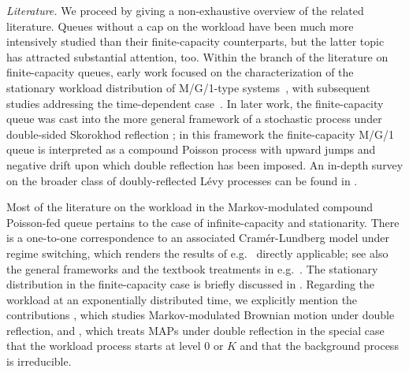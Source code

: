 \documentclass[reqno,12pt]{amsart}
\begin{document}
\medskip

{\it Literature.} We proceed by giving a non-exhaustive overview of the related literature. 
Queues without a cap on the workload have been much more intensively studied than their finite-capacity counterparts, but the latter topic has attracted substantial attention, too. Within the branch of the literature on finite-capacity queues, early work focused on the characterization of the stationary workload distribution of M/G/1-type systems~\cite{JWC,TAK}, with subsequent studies addressing the time-dependent case~\cite{R1,R2}.  In later work, the finite-capacity queue was cast into the more general framework of a stochastic process under double-sided Skorokhod reflection \cite{AND,HOU,KRU}; in this framework the finite-capacity M/G/1 queue is interpreted as a compound Poisson process with upward jumps and negative drift upon which double reflection has been imposed. An in-depth survey on the broader class of doubly-reflected L\'evy processes can be found in \cite{AAGP}. 

Most of the literature on the workload in the Markov-modulated compound Poisson-fed queue pertains to the case of infinite-capacity and stationarity. There is a one-to-one correspondence to an associated Cram\'er-Lundberg model under regime switching, which renders the results of e.g.\ \cite{IV,DM,MKD} directly applicable; see also the general frameworks \cite{DIEK,MKD} and the textbook treatments in e.g.\ \cite{ASM2,AA}. The stationary distribution in the finite-capacity case is briefly discussed in \cite[\S 16]{AAGP}. Regarding the workload at an exponentially distributed time, we explicitly mention the contributions \cite{IV2}, which studies Markov-modulated Brownian motion under double reflection, and \cite[\S 3.3]{IV}, which treats MAPs under double reflection in the special case that the workload process starts at level $0$ or $K$ and that the background process is irreducible.  

\medskip
\end{document}
